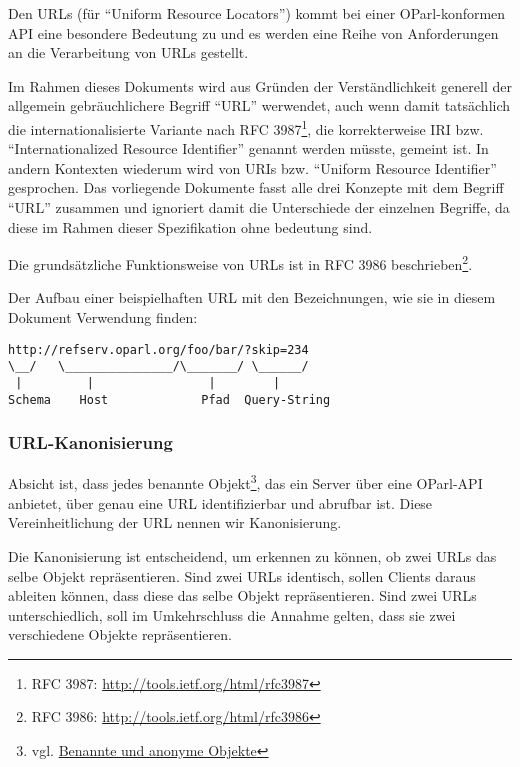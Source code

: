 \documentclass[,a4paper]{article}
\begin{document}

Den URLs (für ``Uniform Resource Locators'') kommt bei einer
OParl-konformen API eine besondere Bedeutung zu und es werden eine Reihe
von Anforderungen an die Verarbeitung von URLs gestellt.

Im Rahmen dieses Dokuments wird aus Gründen der Verständlichkeit
generell der allgemein gebräuchlichere Begriff ``URL'' werwendet, auch
wenn damit tatsächlich die internationalisierte Variante nach RFC
3987\footnote{RFC 3987: \url{http://tools.ietf.org/html/rfc3987}}, die
korrekterweise IRI bzw. ``Internationalized Resource Identifier''
genannt werden müsste, gemeint ist. In andern Kontexten wiederum wird
von URIs bzw. ``Uniform Resource Identifier'' gesprochen. Das
vorliegende Dokumente fasst alle drei Konzepte mit dem Begriff ``URL''
zusammen und ignoriert damit die Unterschiede der einzelnen Begriffe, da
diese im Rahmen dieser Spezifikation ohne bedeutung sind.

Die grundsätzliche Funktionsweise von URLs ist in RFC 3986
beschrieben\footnote{RFC 3986: \url{http://tools.ietf.org/html/rfc3986}}.

Der Aufbau einer beispielhaften URL mit den Bezeichnungen, wie sie in
diesem Dokument Verwendung finden:

\begin{verbatim}
http://refserv.oparl.org/foo/bar/?skip=234
\__/   \_______________/\_______/ \______/
 |         |                |        |
Schema    Host             Pfad  Query-String
\end{verbatim}

\subsubsection{URL-Kanonisierung}\label{url-kanonisierung}

Absicht ist, dass jedes benannte Objekt\footnote{vgl.
  \hyperref[benannteux5fanonymeux5fobjekte]{Benannte und anonyme
  Objekte}}, das ein Server über eine OParl-API anbietet, über genau
eine URL identifizierbar und abrufbar ist. Diese Vereinheitlichung der
URL nennen wir Kanonisierung.

Die Kanonisierung ist entscheidend, um erkennen zu können, ob zwei URLs
das selbe Objekt repräsentieren. Sind zwei URLs identisch, sollen
Clients daraus ableiten können, dass diese das selbe Objekt
repräsentieren. Sind zwei URLs unterschiedlich, soll im Umkehrschluss
die Annahme gelten, dass sie zwei verschiedene Objekte repräsentieren.
\end{document}
